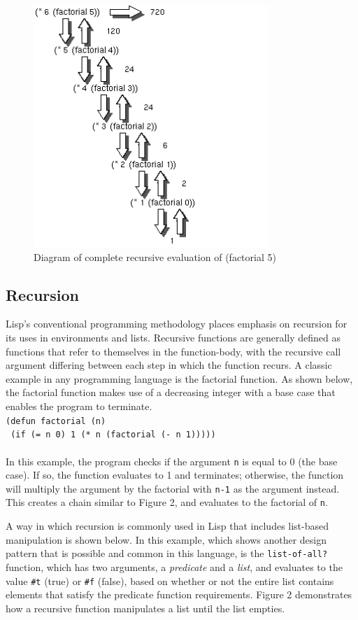 \documentclass[journal]{IEEEtran}
\begin{document}
\begin{figure}[!t]
	\centering
	\includegraphics[width=3.5in]{factorial}
	\caption{Diagram of complete recursive evaluation of (factorial 5)}
	\label{Factorial}
\end{figure}

\subsection{Recursion}
Lisp's conventional programming methodology places emphasis on recursion for its uses in environments and lists. Recursive functions are generally defined as functions that refer to themselves in the function-body, with the recursive call argument differing between each step in which the function recurs. A classic example in any programming language is the factorial function. As shown below, the factorial function makes use of a decreasing integer with a base case that enables the program to terminate. \\

\texttt{(defun factorial (n)}\\\texttt{
	(if (= n 0)
	1
	(* n (factorial (- n 1)))))
}\\\\In this example, the program checks if the argument \texttt{n} is equal to 0 (the base case). If so, the function evaluates to 1 and terminates; otherwise, the function will multiply the argument by the factorial with \texttt{n-1} as the argument instead. This creates a chain similar to Figure 2, and evaluates to the factorial of \texttt{n}.

A way in which recursion is commonly used in Lisp that includes list-based manipulation is shown below. In this example, which shows another design pattern that is possible and common in this language, is the \texttt{list-of-all?} function, which has two arguments, a \textit{predicate} and a \textit{list}, and evaluates to the value \texttt{\#t} (true) or \texttt{\#f} (false), based on whether or not the entire list contains elements that satisfy the predicate function requirements. Figure 2 demonstrates how a recursive function manipulates a list until the list empties. \\
\end{document}
